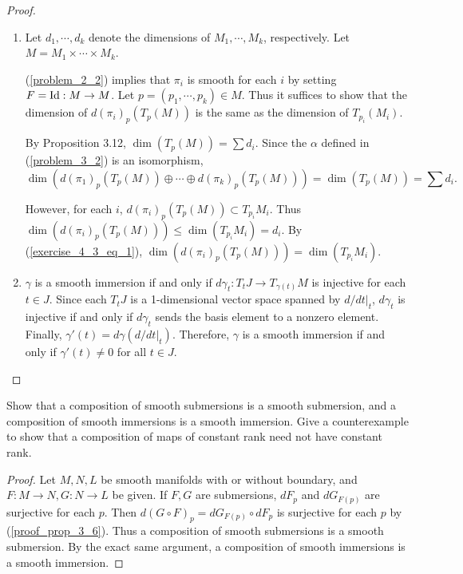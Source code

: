 \begin{proof}
   $ $
  \begin{enumerate}[label=(\alph*)]
    \item
      Let $d_1, \cdots, d_k$ denote the dimensions of $M_1, \cdots, M_k$, respectively.
      Let $M = M_1 \times \cdots \times M_k$.

      (\ref{problem_2_2}) implies that $\pi_i$ is smooth for each $i$ by setting $F = \operatorname{Id}: M \rightarrow M$.
      Let $p = (p_1, \cdots, p_k) \in M$.
      Thus it suffices to show that the dimension of $d(\pi_i)_p(T_p(M))$ is the same as the dimension of $T_{p_i}(M_i)$.

      By Proposition 3.12, $\dim(T_p(M)) = \sum d_i$.
      Since the $\alpha$ defined in (\ref{problem_3_2}) is an isomorphism,
      \begin{equation}\label{exercise_4_3_eq_1}
        \dim(d(\pi_1)_p(T_p(M)) \oplus \cdots \oplus d(\pi_k)_p(T_p(M))) = \dim(T_p(M)) = \sum d_i.
      \end{equation}

      However, for each $i$, $d(\pi_i)_p(T_p(M)) \subset T_{p_i}M_i$.
      Thus $\dim(d(\pi_i)_p(T_p(M))) \leq \dim(T_{p_i}M_i) = d_i$.
      By (\ref{exercise_4_3_eq_1}), $\dim(d(\pi_i)_p(T_p(M))) = \dim(T_{p_i}M_i)$.
    \item
      $\gamma$ is a smooth immersion if and only if $d\gamma_t: T_tJ \rightarrow T_{\gamma(t)}M$ is injective for each $t \in J$.
      Since each $T_tJ$ is a 1-dimensional vector space spanned by $d/dt\vert_t$, $d\gamma_t$ is injective if and only if $d\gamma_t$ sends the basis element to a nonzero element.
      Finally, $\gamma'(t) = d\gamma(d/dt\vert_{t})$.
      Therefore, $\gamma$ is a smooth immersion if and only if $\gamma'(t) \ne 0$ for all $t \in J$.
  \end{enumerate}
\end{proof}

\begin{customexer}{4.4}
  Show that a composition of smooth submersions is a smooth submersion, and a composition of smooth immersions is a smooth immersion.
  Give a counterexample to show that a composition of maps of constant rank need not have constant rank.
\end{customexer}

\begin{proof}
  Let $M, N, L$ be smooth manifolds with or without boundary, and $F: M \rightarrow N, G: N \rightarrow L$ be given.
  If $F, G$ are submersions, $dF_p$ and $dG_{F(p)}$ are surjective for each $p$.
  Then $d(G \circ F)_p = dG_{F(p)} \circ dF_p$ is surjective for each $p$ by (\ref{proof_prop_3_6}).
  Thus a composition of smooth submersions is a smooth submersion.
  By the exact same argument, a composition of smooth immersions is a smooth immersion.
\end{proof}

